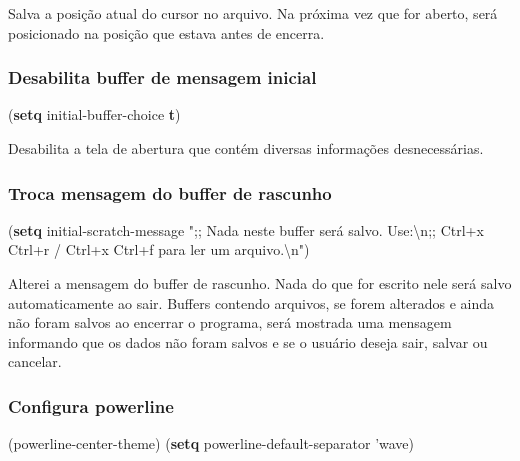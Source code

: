 \documentclass[]{article}
\newenvironment{Shaded}{}{}
\newcommand{\KeywordTok}[1]{\textcolor[rgb]{0.00,0.44,0.13}{\textbf{{#1}}}}
\newcommand{\StringTok}[1]{\textcolor[rgb]{0.25,0.44,0.63}{{#1}}}
\newcommand{\NormalTok}[1]{{#1}}
\begin{document}
Salva a posição atual do cursor no arquivo. Na próxima vez que for
aberto, será posicionado na posição que estava antes de encerra.

\subsubsection{Desabilita buffer de mensagem
inicial}\label{desabilita-buffer-de-mensagem-inicial}

\begin{Shaded}
\begin{Highlighting}[]
\NormalTok{(}\KeywordTok{setq} \NormalTok{initial-buffer-choice}
    \KeywordTok{t}\NormalTok{)}
\end{Highlighting}
\end{Shaded}

Desabilita a tela de abertura que contém diversas informações
desnecessárias.

\subsubsection{Troca mensagem do buffer de
rascunho}\label{troca-mensagem-do-buffer-de-rascunho}

\begin{Shaded}
\begin{Highlighting}[]
\NormalTok{(}\KeywordTok{setq} \NormalTok{initial-scratch-message}
    \StringTok{";; Nada neste buffer será salvo. Use:}\NormalTok{\textbackslash{}n}\StringTok{;;}
\StringTok{    Ctrl+x Ctrl+r / Ctrl+x Ctrl+f para ler um arquivo.}\NormalTok{\textbackslash{}n}\StringTok{"}\NormalTok{)}
\end{Highlighting}
\end{Shaded}

Alterei a mensagem do buffer de rascunho. Nada do que for escrito nele
será salvo automaticamente ao sair. Buffers contendo arquivos, se forem
alterados e ainda não foram salvos ao encerrar o programa, será mostrada
uma mensagem informando que os dados não foram salvos e se o usuário
deseja sair, salvar ou cancelar.

\subsubsection{Configura powerline}\label{configura-powerline}

\begin{Shaded}
\begin{Highlighting}[]
\NormalTok{(powerline-center-theme)}
\NormalTok{(}\KeywordTok{setq} \NormalTok{powerline-default-separator}
      \NormalTok{'wave)}
\end{Highlighting}
\end{Shaded}
\end{document}
